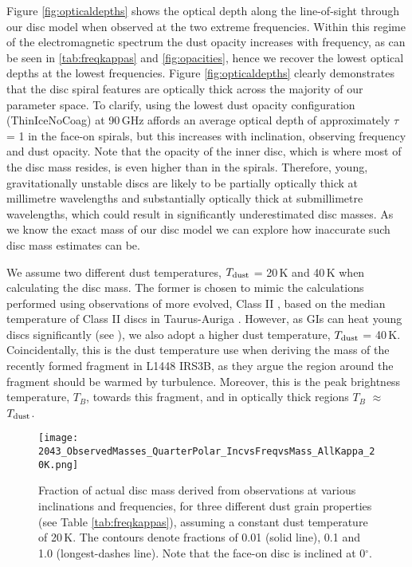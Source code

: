 \documentclass[fleqn,usenatbib]{mnras}
\begin{document}
Figure \ref{fig:opticaldepths} shows the optical depth along the line-of-sight through our disc model when observed at the two extreme frequencies. Within this regime of the electromagnetic spectrum the dust opacity increases with frequency, as can be seen in \autoref{tab:freqkappas} and \autoref{fig:opacities}, hence we recover the lowest optical depths at the lowest frequencies. Figure \ref{fig:opticaldepths} clearly demonstrates that the disc spiral features are optically thick across the majority of our parameter space. To clarify, using the lowest dust opacity configuration (ThinIceNoCoag) at 90\,GHz affords an average optical depth of approximately $\tau$ = 1 in the face-on spirals, but this increases with inclination, observing frequency and dust opacity. Note that the opacity of the inner disc, which is where most of the disc mass resides, is even higher than in the spirals. Therefore, young, gravitationally unstable discs are likely to be partially optically thick at millimetre wavelengths and substantially optically thick at submillimetre wavelengths, which could result in significantly underestimated disc masses. As we know the exact mass of our disc model we can explore how inaccurate such disc mass estimates can be.

\smallskip

We assume two different dust temperatures, $T_ {\rm dust}$ = 20\,K and 40\,K when calculating the disc mass. The former is chosen to mimic the calculations performed using observations of more evolved, Class II \citep[e.g][]{Ansdell&Williams2016}, based on the median temperature of Class II discs in Taurus-Auriga \citep{Andrews&Williams2005}. However, as GIs can heat young discs significantly (see ), we also adopt a higher dust temperature, $T_{\rm dust}$ = 40\,K. Coincidentally, this is the dust temperature \citet{Tobin&Kratter2016} use when deriving the mass of the recently formed fragment in L1448 IRS3B, as they argue the region around the fragment should be warmed by turbulence. Moreover, this is the peak brightness temperature, $T_B$, towards this fragment, and in optically thick regions $T_B$ $\approx$ $T_ {\rm dust}$.

\begin{figure*}
    \texttt{[image: 2043\_ObservedMasses\_QuarterPolar\_IncvsFreqvsMass\_AllKappa\_20K.png]}
    \caption{Fraction of actual disc mass derived from observations at various inclinations and frequencies, for three different dust grain properties (see Table \ref{tab:freqkappas}), assuming a constant dust temperature of 20\,K. The contours denote fractions of 0.01 (solid line), 0.1 and 1.0 (longest-dashes line). Note that the face-on disc is inclined at 0$^\circ$.}
    \label{fig:20Kmass}
\end{figure*}
\end{document}
